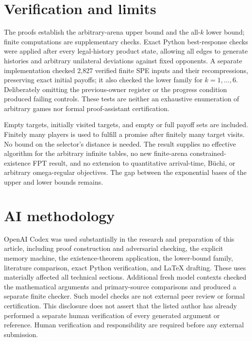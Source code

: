 \documentclass[acmlarge,11pt,screen,nonacm,natbib=false]{acmart}
\theoremstyle{remark}
\begin{document}
\section{Verification and limits}

The proofs establish the arbitrary-arena upper bound and the all-$k$
lower bound; finite computations are supplementary checks. Exact Python
best-response checks were applied after every legal-history product state,
allowing all edges to generate histories and arbitrary unilateral
deviations against fixed opponents. A separate implementation checked
2,827 verified finite SPE inputs and their recompressions, preserving exact
initial payoffs; it also checked the lower family for $k=1,\ldots,6$.
Deliberately omitting the previous-owner register or the progress condition
produced failing controls. These tests are neither an exhaustive enumeration
of arbitrary games nor formal proof-assistant certification.

Empty targets, initially visited targets, and empty or full payoff sets
are included. Finitely many players is used to fulfill a promise after
finitely many target visits. No bound on the selector's distance is needed.
The result supplies no effective algorithm for the arbitrary infinite
tables, no new finite-arena constrained-existence FPT result, and no extension
to quantitative arrival-time, B\"uchi, or arbitrary omega-regular objectives.
The gap between the exponential bases of the upper and lower bounds remains.

\section*{AI methodology}
OpenAI Codex was used substantially in the research and preparation of this
article, including proof construction and adversarial checking, the explicit
memory machine, the existence-theorem application, the lower-bound family,
literature comparison, exact Python verification, and LaTeX drafting.
These uses materially affected all technical sections. Additional fresh
model contexts checked the mathematical arguments and primary-source
comparisons and produced a separate finite checker. Such model checks are
not external peer review or formal certification. This disclosure does not
assert that the listed author has already performed a separate human
verification of every generated argument or reference. Human verification
and responsibility are required before any external submission.

\clearpage


\end{document}
